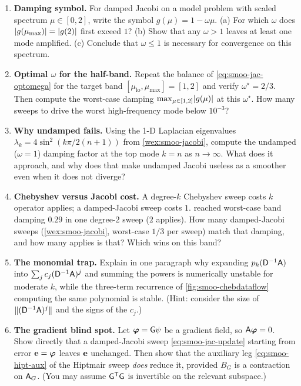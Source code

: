 \exercisessection
\begin{enumerate}[nosep]
  \item \textbf{Damping symbol.} For damped Jacobi on a model problem with scaled
  spectrum $\mu\in[0,2]$, write the symbol $g(\mu)=1-\omega\mu$. (a) For which
  $\omega$ does $\lvert g(\mu_{\max})\rvert=\lvert g(2)\rvert$ first exceed $1$? (b) Show that any
  $\omega>1$ leaves at least one mode amplified. (c) Conclude that
  $\omega\le1$ is necessary for convergence on this spectrum.

  \item \textbf{Optimal $\omega$ for the half-band.} Repeat the balance of
  \cref{eq:smoo-jac-optomega} for the target band $[\mu_{\mathrm{lo}},\mu_{\max}]
  =[1,2]$ and verify $\omega^\star=2/3$. Then compute the worst-case damping
  $\max_{\mu\in[1,2]}\lvert g(\mu)\rvert$ at this $\omega^\star$. How many sweeps to drive
  the worst high-frequency mode below $10^{-3}$?

  \item \textbf{Why undamped fails.} Using the 1-D Laplacian eigenvalues
  $\lambda_k=4\sin^2(k\pi/2(n+1))$ from \cref{wex:smoo-jacobi}, compute the
  undamped ($\omega=1$) damping factor at the top mode $k=n$ as $n\to\infty$.
  What does it approach, and why does that make undamped Jacobi useless as a
  smoother even when it does not diverge?

  \item \textbf{Chebyshev versus Jacobi cost.} A degree-$k$ Chebyshev sweep costs
  $k$ operator applies; a damped-Jacobi sweep costs $1$. 
  reached worst-case band damping $0.29$ in one degree-$2$ sweep ($2$ applies). How
  many damped-Jacobi sweeps (\cref{wex:smoo-jacobi}, worst-case $1/3$ per sweep)
  match that damping, and how many applies is that? Which wins on this band?

  \item \textbf{The monomial trap.} Explain in one paragraph why expanding
  $p_k(\mathsf{D}^{-1}\mathsf{A})$ into $\sum_j c_j(\mathsf{D}^{-1}\mathsf{A})^j$ and summing the
  powers is numerically unstable for moderate $k$, while the three-term recurrence of
  \cref{fig:smoo-chebdataflow} computing the same polynomial is stable. (Hint:
  consider the size of $\lVert(\mathsf{D}^{-1}\mathsf{A})^j\rVert$ and the signs of the $c_j$.)

  \item \textbf{The gradient blind spot.} Let $\boldsymbol{\varphi}=\mathsf{G}\psi$ be a gradient
  field, so $\mathsf{A}\boldsymbol{\varphi}=0$. Show directly that a damped-Jacobi sweep
  \cref{eq:smoo-jac-update} starting from error $\mathbf{e}=\boldsymbol{\varphi}$ leaves $\mathbf{e}$ unchanged.
  Then show that the auxiliary leg \cref{eq:smoo-hipt-aux} of the Hiptmair sweep
  \emph{does} reduce it, provided $B_G$ is a contraction on $\mathsf{A}_G$. (You may
  assume $\mathsf{G}^{\mathsf T}\mathsf{G}$ is invertible on the relevant subspace.)


\end{enumerate}
